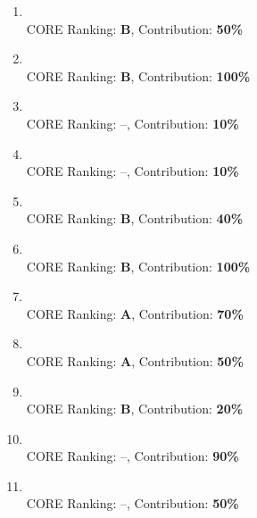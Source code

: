 \begin{enumerate}
  \item {} \\
  \textbullet\enspace CORE Ranking: \textbf{B}, Contribution: \textbf{50\%}

  \item {} \\
  \textbullet\enspace CORE Ranking: \textbf{B}, Contribution: \textbf{100\%}

  \item {} \\
  \textbullet\enspace CORE Ranking: --, Contribution: \textbf{10\%}
  
  \item {} \\
  \textbullet\enspace CORE Ranking: --, Contribution: \textbf{10\%}
  
  \item {} \\
  \textbullet\enspace CORE Ranking: \textbf{B}, Contribution: \textbf{40\%}
  
  \item {} \\
  \textbullet\enspace CORE Ranking: \textbf{B}, Contribution: \textbf{100\%}
  
  \item {} \\
  \textbullet\enspace CORE Ranking: \textbf{A}, Contribution: \textbf{70\%}
  
  \item {} \\
  \textbullet\enspace CORE Ranking: \textbf{A}, Contribution: \textbf{50\%}
  
  \item {} \\
  \textbullet\enspace CORE Ranking: \textbf{B}, Contribution: \textbf{20\%} %
  
  \item {} \\
  \textbullet\enspace CORE Ranking: --, Contribution: \textbf{90\%}
  
  \item {} \\
  \textbullet\enspace CORE Ranking: --, Contribution: \textbf{50\%}
  

\end{enumerate}

